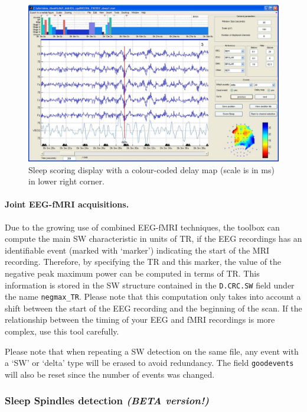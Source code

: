 \documentclass[a4paper,titlepage]{article}
\begin{document}
\begin{figure}[ht]
	\centering
		\includegraphics[width=15cm]{images/FIG17_dis_SW.jpg}
	\caption{Sleep scoring display with a colour-coded delay map (scale is in ms) in lower right corner.
	\label{fig:SWS_dis}}
\end{figure}

\paragraph{Joint EEG-fMRI acquisitions.}
Due to the growing use of combined EEG-fMRI techniques, the toolbox can compute the main SW characteristic in units of TR, if the EEG recordings has an identifiable event (marked with `marker') indicating the start of the MRI recording. Therefore, by specifying the TR and this marker, the value of the negative peak maximum power can be computed in terms of TR. This information is stored in the SW structure contained in the {\tt D.CRC.SW} field under the name {\tt negmax\_TR}. Please note that this computation only takes into account a shift between the start of the EEG recording and the beginning of the scan. If the relationship between the timing of your EEG and fMRI recordings is more complex, use this tool carefully.

Please note that when repeating a SW detection on the same file, any event with a `SW' or `delta' type will be erased to avoid redundancy. The field {\tt goodevents} will also be reset since the number of events was changed.

\subsubsection{Sleep Spindles detection {\itshape\bfseries (BETA version!)}}
\label{sec:SPdetection}
\end{document}
